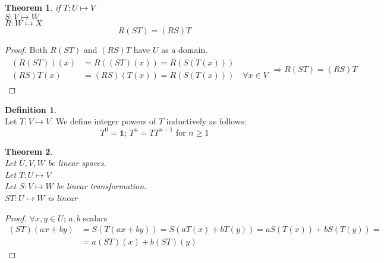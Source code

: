 \documentclass[twoside]{amsart}
\theoremstyle{plain}
\newtheorem{theorem}{Theorem}
\theoremstyle{definition}
\newtheorem{definition}{Definition}
\begin{document}
\begin{theorem}
if 
\phantom{if} $T:U \mapsto V$ \\
\phantom{if} $S:V \mapsto W$ \\
\phantom{if} $R:W \mapsto X$ 
\begin{equation}
R(ST) = (RS)T
\end{equation}
\end{theorem}

\begin{proof}
Both $R(ST)$ and $(RS)T$ have $U$ as a domain. \\
\begin{gather*}
\begin{aligned}
  (R(ST))(x) &= R((ST)(x)) = R(S(T(x))) \\
  (RS)T(x) &= (RS)(T(x)) = R(S(T(x))) \quad \forall x \in V
\end{aligned}
\Longrightarrow R(ST) = (RS)T
\end{gather*}
\end{proof}

\begin{definition} \quad \\
Let $T:V \mapsto V$.  We define integer powers of $T$ inductively as follows:
\begin{equation}
T^0 = \mathbf{1}; \, T^n = TT^{n-1} \text{ for } n \geq 1
\end{equation}
\end{definition}

\begin{theorem}\quad \\
Let $U,V,W$ be linear spaces. \\
Let $T:U\mapsto V$\\
Let $S:V\mapsto W$ be linear transformation. \\  
\phantom{Let} $ST:U \mapsto W$ is linear
\end{theorem}

\begin{proof}
$\forall x,y \in U; \, a,b \text{ scalars }$ \\
\begin{align*}
(ST)(ax +by) &= S(T(ax+by)) = S(aT(x) + bT(y)) = aS(T(x)) + bS(T(y)) = \\
  &= a(ST)(x) + b(ST)(y) 
\end{align*}
\end{proof}
\end{document}
